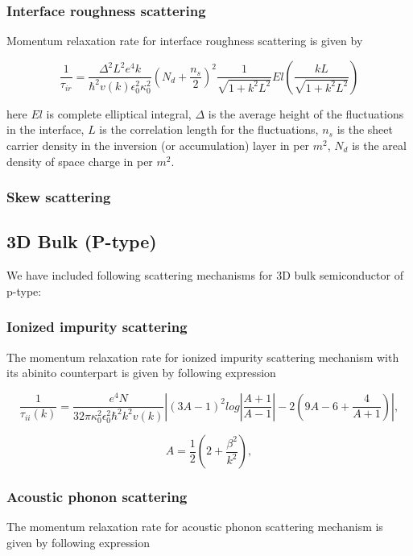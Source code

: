 \documentclass[12pt]{article}
\begin{document}
\subsubsection{Interface roughness scattering}
Momentum relaxation rate for interface roughness scattering is given by \cite{goodnick1985surface, ferry2016semiconductor}

\begin{equation}
    \frac{1}{\tau_{ir}} = \frac{\Delta^2 L^2  e^4 k}{\hbar^2 v(k) \epsilon_0^2 \kappa_0^2} \left( N_{d} + \frac{n_s}{2} \right)^2 \frac{1}{\sqrt{1+k^2L^2}} El(\frac{kL}{\sqrt{1+k^2L^2}})
    \label{ir}
\end{equation}

here $El$ is complete elliptical integral, $\Delta$ is the average height of the fluctuations in the interface, $L$ is the correlation length for the fluctuations, $n_s$ is the sheet carrier density in the inversion (or accumulation) layer in per $m^2$, $N_{d}$ is the areal density of space charge in per $m^2$.
\subsubsection{Skew scattering}


\subsection{3D Bulk (P-type)}
We have included following scattering mechanisms for 3D bulk semiconductor of p-type: 

\subsubsection{Ionized impurity scattering}
The momentum relaxation rate for ionized impurity scattering mechanism with its abinito counterpart is given by following expression \cite{ramu2011thermoelectric}

\begin{equation}
\frac{1}{\tau_{ii}(k)} = \frac{e^4 N }{32\pi \kappa_0^2 \epsilon_0^2\hbar^2 k^2 v(k)} \left|  (3A-1)^2 log \left|  \frac{A+1}{A-1} \right|  -2 (9A-6+ \frac{4}{A+1}) \right|  ,
\label{Ionized_impurity_p}
\end{equation}

\begin{equation}
A = \frac{1}{2} \left(2 + \frac{\beta^2}{k^2}\right),
\label{A}
\end{equation}

\subsubsection{Acoustic phonon scattering}
The momentum relaxation rate for acoustic phonon scattering mechanism is given by following expression \cite{ramu2011thermoelectric}
\end{document}
